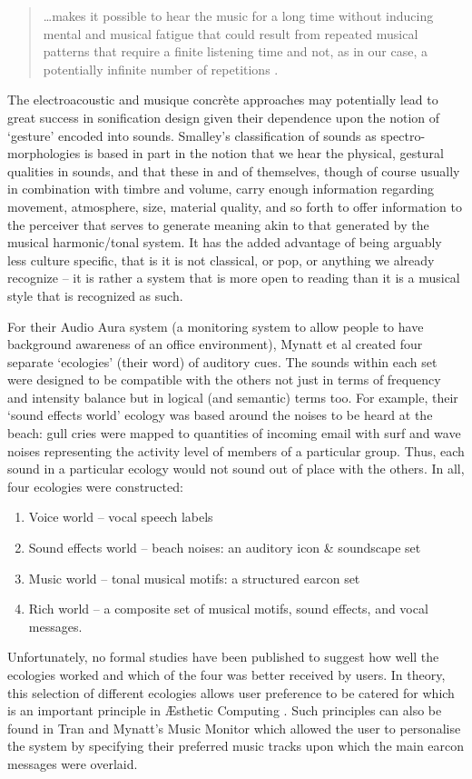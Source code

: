 \documentclass{article}
\begin{document}
\begin{quotation}
 \ldots makes it possible to hear the music for a long time without inducing mental and musical fatigue that could result from repeated musical patterns that require a finite listening time and not, as in our case, a potentially infinite number of repetitions \cite{Barra:2002}.
 \end{quotation} 
The electroacoustic and musique concrète approaches may potentially lead to great success in sonification design given their dependence upon the notion of `gesture' encoded into sounds. Smalley's classification of sounds as spectro-morphologies \cite{Smalley:1986} is based in part in the notion that we hear the physical, gestural qualities in sounds, and that these in and of themselves, though of course usually in combination with timbre and volume, carry enough information regarding movement, atmosphere, size, material quality, and so forth to offer information to the perceiver that serves to generate meaning akin to that generated by the musical harmonic/tonal system. It has the added advantage of being arguably less culture specific, that is it is not classical, or pop, or anything we already recognize -- it is rather a system that is more open to reading than it is a musical style that is recognized as such. 

For their {\sc Audio Aura} system (a monitoring system to allow people to have background awareness of an office environment), Mynatt et al \cite{Mynatt:1997a,Mynatt:1998} created four separate `ecologies' (their word) of auditory cues. The sounds within each set were designed to be compatible with the others not just in terms of frequency and intensity balance but in logical (and semantic) terms too. For example, their `sound effects world' ecology was based around the noises to be heard at the beach: gull cries were mapped to quantities of incoming email with surf and wave noises representing the activity level of members of a particular group. Thus, each sound in a particular ecology would not sound out of place with the others. In all, four ecologies were constructed:
\begin{enumerate}
\item Voice world -- vocal speech labels
\item Sound effects world -- beach noises: an auditory icon \& sound\-scape set
\item Music world -- tonal musical motifs: a structured earcon set
\item Rich world -- a composite set of musical motifs, sound effects, and vocal messages.
\end{enumerate}
Unfortunately, no formal studies have been published to suggest how well the ecologies worked and which of the four was better received by users. In theory, this selection of different ecologies allows user preference to be catered for which is an important principle in Æsthetic Computing \cite{Fishwick:2002,Fishwick:2006}. Such principles can also be found in Tran and Mynatt's {\sc Music Monitor} \cite{Tran:2000} which allowed the user to personalise the system by specifying their preferred music tracks upon which the main earcon messages were overlaid.
\end{document}
